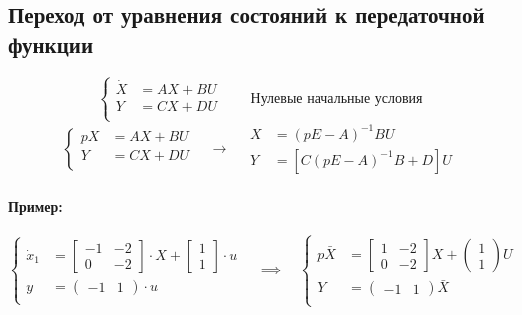 \subsection{Переход от уравнения состояний к передаточной функции}
\[
  \left\{\begin{aligned} 
    \dot X &= AX + BU \\
    Y &= CX + DU \\
  \end{aligned}\right. \qquad \text{Нулевые начальные условия}
\] 
\[
  \left\{\begin{aligned} 
    pX &= AX + BU \\
    Y &= CX + DU \\
  \end{aligned}\right. \quad \to \quad
  \begin{aligned}
    X &= (pE - A)^{-1} BU \\ Y &= [C(pE-A)^{-1}B + D]U
  \end{aligned}
\] 

\paragraph{Пример:}
\[
 \left\{\begin{aligned} 
     \dot x_1 &= \begin{bmatrix} -1 & -2 \\ 0 & -2 \end{bmatrix} \cdot X + 
     \begin{bmatrix} 1 \\ 1 \end{bmatrix} \cdot u\\ 
     y &= \begin{pmatrix} -1 & 1 \end{pmatrix} \cdot u \\
 \end{aligned}\right. \quad \implies \quad 
 \left\{\begin{aligned} 
     p \bar X &= \begin{bmatrix} 1& -2 \\ 0 & -2 \end{bmatrix} X +
     \begin{pmatrix} 1 \\ 1 \end{pmatrix} U \\
     Y &= \begin{pmatrix} -1 & 1 \end{pmatrix} \bar X \\
 \end{aligned}\right. 
\] 

